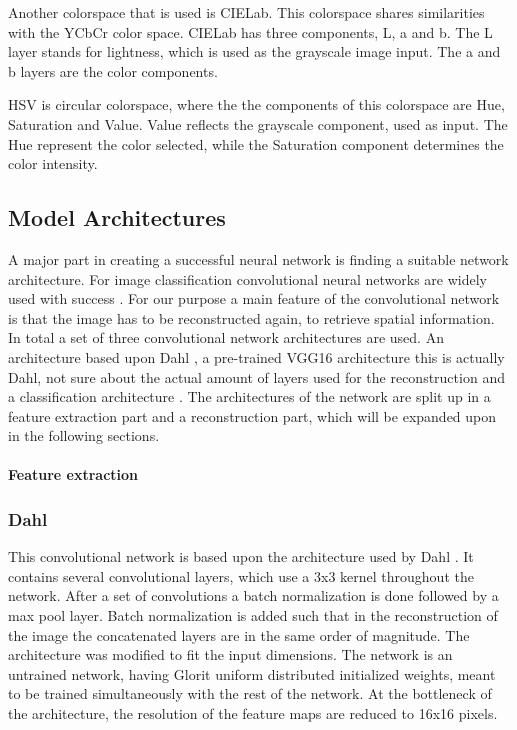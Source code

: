 Another colorspace that is used is CIELab. This colorspace shares similarities with the YCbCr color space. CIELab has three components, L, a and b. The L layer stands for lightness, which is used as the grayscale image input. The a and b layers are the color components. 

HSV is circular colorspace, where the the components of this colorspace are Hue, Saturation and Value. Value reflects the grayscale component, used as input. The Hue represent the color selected, while the Saturation component determines the color intensity. 

\subsection{Model Architectures}
A major part in creating a successful neural network is finding a suitable network architecture. For image classification convolutional neural networks are widely used with success \cite{Krizhevsky,Szegedy,Simonyan} . For our purpose a main feature of the convolutional network is that the image has to be reconstructed again, to retrieve spatial information. In total a set of three convolutional network architectures are used. An architecture based upon Dahl \cite{Dahl}, a pre-trained VGG16 \cite{Simonyan} architecture {\color{red} this is actually Dahl,  not sure about the actual amount of layers used for the reconstruction} and a classification architecture \cite{Zhang}. The architectures of the network are split up in a feature extraction part and a reconstruction part, which will be expanded upon in the following sections.\\ 
\\%
\textbf{Feature extraction}

\subsubsection{Dahl}%


This convolutional network is based upon the architecture used by Dahl \cite{Dahl}. It contains several convolutional layers, which use a 3x3 kernel throughout the network. After a set of convolutions a batch normalization is done followed by a max pool layer. Batch normalization is added such that in the reconstruction of the image the concatenated layers are in the same order of magnitude. The architecture was modified to fit the input dimensions. The network is an untrained network, having Glorit uniform distributed \cite{Glorot} initialized weights, meant to be trained simultaneously with the rest of the network. At the bottleneck of the architecture, the resolution of the feature maps are reduced to 16x16 pixels.
 
